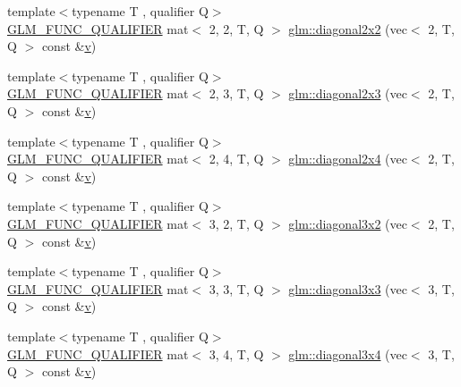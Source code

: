 \begin{DoxyCompactItemize}
\item 
{\footnotesize template$<$typename T , qualifier Q$>$ }\\\hyperlink{setup_8hpp_a33fdea6f91c5f834105f7415e2a64407}{G\+L\+M\+\_\+\+F\+U\+N\+C\+\_\+\+Q\+U\+A\+L\+I\+F\+I\+ER} mat$<$ 2, 2, T, Q $>$ \hyperlink{group__gtx__matrix__operation_ga58a32a2beeb2478dae2a721368cdd4ac}{glm\+::diagonal2x2} (vec$<$ 2, T, Q $>$ const \&\hyperlink{_s_d_l__opengl_8h_a10a82eabcb59d2fcd74acee063775f90}{v})
\item 
{\footnotesize template$<$typename T , qualifier Q$>$ }\\\hyperlink{setup_8hpp_a33fdea6f91c5f834105f7415e2a64407}{G\+L\+M\+\_\+\+F\+U\+N\+C\+\_\+\+Q\+U\+A\+L\+I\+F\+I\+ER} mat$<$ 2, 3, T, Q $>$ \hyperlink{group__gtx__matrix__operation_gab69f900206a430e2875a5a073851e175}{glm\+::diagonal2x3} (vec$<$ 2, T, Q $>$ const \&\hyperlink{_s_d_l__opengl_8h_a10a82eabcb59d2fcd74acee063775f90}{v})
\item 
{\footnotesize template$<$typename T , qualifier Q$>$ }\\\hyperlink{setup_8hpp_a33fdea6f91c5f834105f7415e2a64407}{G\+L\+M\+\_\+\+F\+U\+N\+C\+\_\+\+Q\+U\+A\+L\+I\+F\+I\+ER} mat$<$ 2, 4, T, Q $>$ \hyperlink{group__gtx__matrix__operation_ga30b4dbfed60a919d66acc8a63bcdc549}{glm\+::diagonal2x4} (vec$<$ 2, T, Q $>$ const \&\hyperlink{_s_d_l__opengl_8h_a10a82eabcb59d2fcd74acee063775f90}{v})
\item 
{\footnotesize template$<$typename T , qualifier Q$>$ }\\\hyperlink{setup_8hpp_a33fdea6f91c5f834105f7415e2a64407}{G\+L\+M\+\_\+\+F\+U\+N\+C\+\_\+\+Q\+U\+A\+L\+I\+F\+I\+ER} mat$<$ 3, 2, T, Q $>$ \hyperlink{group__gtx__matrix__operation_ga832c805d5130d28ad76236958d15b47d}{glm\+::diagonal3x2} (vec$<$ 2, T, Q $>$ const \&\hyperlink{_s_d_l__opengl_8h_a10a82eabcb59d2fcd74acee063775f90}{v})
\item 
{\footnotesize template$<$typename T , qualifier Q$>$ }\\\hyperlink{setup_8hpp_a33fdea6f91c5f834105f7415e2a64407}{G\+L\+M\+\_\+\+F\+U\+N\+C\+\_\+\+Q\+U\+A\+L\+I\+F\+I\+ER} mat$<$ 3, 3, T, Q $>$ \hyperlink{group__gtx__matrix__operation_ga5487ff9cdbc8e04d594adef1bcb16ee0}{glm\+::diagonal3x3} (vec$<$ 3, T, Q $>$ const \&\hyperlink{_s_d_l__opengl_8h_a10a82eabcb59d2fcd74acee063775f90}{v})
\item 
{\footnotesize template$<$typename T , qualifier Q$>$ }\\\hyperlink{setup_8hpp_a33fdea6f91c5f834105f7415e2a64407}{G\+L\+M\+\_\+\+F\+U\+N\+C\+\_\+\+Q\+U\+A\+L\+I\+F\+I\+ER} mat$<$ 3, 4, T, Q $>$ \hyperlink{group__gtx__matrix__operation_gad7551139cff0c4208d27f0ad3437833e}{glm\+::diagonal3x4} (vec$<$ 3, T, Q $>$ const \&\hyperlink{_s_d_l__opengl_8h_a10a82eabcb59d2fcd74acee063775f90}{v})

\end{DoxyCompactItemize}
